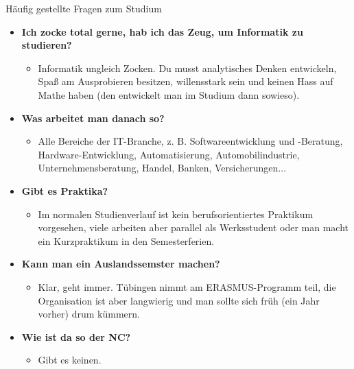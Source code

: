 \begin{block}{Häufig gestellte Fragen zum Studium}
\begin{large}
\begin{itemize}
	

		\item \textbf{Ich zocke total gerne, hab ich das Zeug, um Informatik zu studieren?}
		\begin{itemize}
			\item Informatik ungleich Zocken. Du musst analytisches Denken entwickeln, Spaß am Ausprobieren besitzen, willensstark sein und keinen Hass auf Mathe haben (den entwickelt man im Studium dann sowieso).
		\end{itemize}

	

		\item \textbf{Was arbeitet man danach so?}
		\begin{itemize}
			\item Alle Bereiche der IT-Branche, z. B. Softwareentwicklung und -Beratung, Hardware-Entwicklung, Automatisierung, Automobilindustrie, Unternehmensberatung, Handel, Banken, Versicherungen...
		\end{itemize}

	

		\item \textbf{Gibt es Praktika?}
		\begin{itemize}
			\item Im normalen Studienverlauf ist kein berufsorientiertes Praktikum vorgesehen, viele arbeiten aber parallel als Werksstudent oder man macht ein Kurzpraktikum in den Semesterferien.
		\end{itemize}



		\item \textbf{Kann man ein Auslandssemster machen?}
		\begin{itemize}
			\item  Klar, geht immer. Tübingen nimmt am ERASMUS-Programm teil, die Organisation ist aber langwierig und man sollte sich früh (ein Jahr vorher) drum kümmern.
		\end{itemize}



		\item \textbf{Wie ist da so der NC?}
		\begin{itemize}
			\item Gibt es keinen.
		\end{itemize}
\end{itemize}
\end{large}
\end{block}

